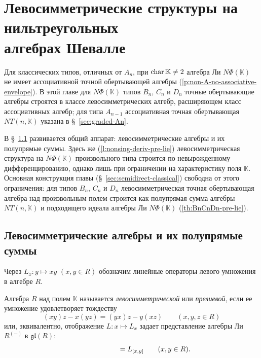 \documentclass[a4paper,14pt,oneside,openany]{memoir}
\begin{document}
\chapter[Левосимметрические структуры на нильтреугольных алгебрах Шевалле]{Левосимметрические структуры на нильтреугольных\\алгебрах Шевалле}\label{ch:pre-lie}

Для классических типов, отличных от $A_n$, при $\operatorname{char}\mathbb{K}\neq2$ алгебра
Ли $N\Phi(\mathbb{K})$ не имеет ассоциативной точной обертывающей алгебры
(\cref{p:non-A-no-associative-envelope}). В этой главе для $N\Phi(\mathbb{K})$
типов $B_n$, $C_n$ и $D_n$ точные обертывающие алгебры строятся в классе
левосимметрических алгебр, расширяющем класс ассоциативных алгебр; для типа
$A_{n-1}$ ассоциативная точная обертывающая $NT(n,\mathbb{K})$ указана в
\S~\ref{sec:graded-An}.

\medskip

В \S~\ref{sec:pre-lie-algs} развивается общий аппарат: левосимметрические
алгебры и их полупрямые суммы. Здесь же (\cref{l:nonsing-deriv-pre-lie})
левосимметрическая структура на $N\Phi(\mathbb{K})$ произвольного типа строится
по невырожденному дифференцированию, однако лишь при ограничении на
характеристику поля $\mathbb{K}$. Основная конструкция главы
(\S~\ref{sec:semidirect-classical}) свободна от этого ограничения: для типов
$B_n$, $C_n$ и $D_n$ левосимметрическая точная обертывающая алгебра над
произвольным полем строится как полупрямая сумма алгебры $NT(n,\mathbb{K})$ и
подходящего идеала алгебры Ли $N\Phi(\mathbb{K})$ (\cref{th:BnCnDn-pre-lie}).

\section{Левосимметрические алгебры и их полупрямые суммы}\label{sec:pre-lie-algs}
%
Через $L_x\colon y\mapsto xy$ $(x,y \in R)$ обозначим линейные операторы левого
умножения в алгебре $R$.
\begin{definition}\label{def:pre-lie-algebra}
    Алгебра $R$ над полем $\mathbb{K}$ называется \emph{левосимметрической} или
    \emph{прелиевой}, если ее умножение удовлетворяет тождеству
    \begin{equation*}
        (xy)z-x(yz)=(yx)z-y(xz) \qquad (x,y,z\in R)
    \end{equation*}
    или, эквивалентно, отображение $L\colon x \mapsto L_x$ задает представление
    алгебры Ли $R^{(-)}$ в $\mathfrak{gl}(R)$:
    \begin{equation*}
        [L_x,L_y]=L_{[x,y]} \mathrlap{\qquad (x,y \in R).}
    \end{equation*}
\end{definition}
\end{document}
